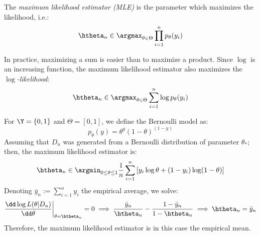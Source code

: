 \documentclass[toc, titlepaged]{../cs-classes/cs-classes}
\begin{document}
\begin{definition}
    The \emph{maximum likelihood estimator (MLE)} is the parameter which maximizes the likelihood, i.e.:
    \begin{equation}
        \htheta_n\in\argmax_{\theta\in\Theta} \prod_{i=1}^n p_\theta(y_i)
    \end{equation}
\end{definition}

In practice, maximizing a sum is easier than to maximize a product. Since $\log$ is an increasing function, the maximum likelihood estimator also maximizes the \emph{$\log$-likelihood}:
\begin{equation}
    \htheta_n\in\argmax_{\theta\in\Theta} \sum_{i=1}^n \log p_\theta(y_i)
\end{equation}

\begin{example}
    For $\Y=\{0, 1\}$ and $\Theta=[0, 1]$, we define the Bernoulli model as:
    \begin{equation*}
        p_\theta(y) = \theta^y(1-\theta)^{(1-y)}
    \end{equation*}
    Assuming that $D_n$ was generated from a Bernoulli distribution of parameter $\theta_*$; then, the maximum likelihood estimator is:
    \begin{equation*}
        \htheta_n\in\argmin_{0\leq\theta\leq1} \frac{1}{n} \sum_{i=1}^n \left[y_i\log\theta + (1-y_i)\log(1-\theta)\right]
    \end{equation*}
    Denoting $\bar{y}_n := \sum_{i=1}^ny_i$ the empirical average, we solve:
    \begin{equation*}
        \frac{\dd\log L(\theta|D_n)}{\dd\theta} \biggr\rvert_{\theta=\htheta_n} = 0 \implies \frac{\bar{y}_n}{\htheta_n} - \frac{1-\bar{y}_n}{1-\htheta_n} \implies \htheta_n = \bar{y}_n
    \end{equation*} 
    Therefore, the maximum likelihood estimator is in this case the empirical mean.
\end{example}
\end{document}
